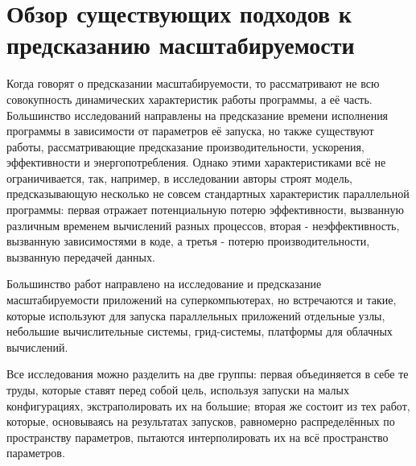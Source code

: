 \section{Обзор существующих подходов к предсказанию масштабируемости}
	Когда говорят о предсказании масштабируемости, то рассматривают не всю совокупность динамических характеристик работы программы, а её часть. Большинство исследований направлены на предсказание времени исполнения программы в зависимости от параметров её запуска, но также существуют работы, рассматривающие предсказание производительности, ускорения, эффективности и энергопотребления. Однако этими характеристиками всё не ограничивается, так, например, в исследовании \cite{efficiency_prediction} авторы строят модель, предсказывающую несколько не совсем стандартных характеристик параллельной программы: первая отражает потенциальную потерю эффективности, вызванную различным временем вычислений разных процессов, вторая - неэффективность, вызванную зависимостями в коде, а третья - потерю производительности, вызванную передачей данных.

	Большинство работ направлено на исследование и предсказание масштабируемости приложений на суперкомпьютерах, но встречаются и такие, которые используют для запуска параллельных приложений отдельные узлы, небольшие вычислительные системы, грид-системы, платформы для облачных вычислений.

	Все исследования можно разделить на две группы: первая объединяется в себе те труды, которые ставят перед собой цель, используя запуски на малых конфигурациях, экстраполировать их на большие; вторая же состоит из тех работ, которые, основываясь на результатах запусков, равномерно распределённых по пространству параметров, пытаются интерполировать их на всё пространство параметров.

